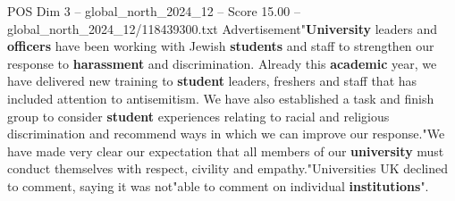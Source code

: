 \begin{textsample}{POS Dim 3 – global\_north\_2024\_12 – Score 15.00 – global\_north\_2024\_12/118439300.txt}
Advertisement"\textbf{University} leaders and \textbf{officers} have been working with Jewish \textbf{students} and staff to strengthen our response to \textbf{harassment} and discrimination.
Already this \textbf{academic} year, we have delivered new training to \textbf{student} leaders, freshers and staff that has included attention to antisemitism.
We have also established a task and finish group to consider \textbf{student} experiences relating to racial and religious discrimination and recommend ways in which we can improve our response."We have made very clear our expectation that all members of our \textbf{university} must conduct themselves with respect, civility and empathy."Universities UK declined to comment, saying it was not"able to comment on individual \textbf{institutions}".

\end{textsample}
